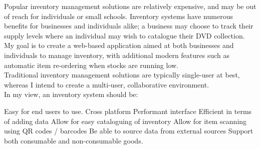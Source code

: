 \documentclass[../../../main.tex]{subfiles}
\begin{document}
\begin{comment}
- not always designed for multi user?
- not intuitive?

GS (till end): not user friendly?
shoudn't be time consuming to add data/etc
manual admin can be time consuming, try to automate
ability for mutliple concurrent users
easy and transpaancy for multi users
log in and see what was done the day before
easy to follow/read

not able to re-order items in a single place
have to go do diff platforms when ready to re-order

limited functionality
want to be able to track purchased items
as well as handle budgeting
existing solutions don't have multiple functions
so you need to duplicate information on different apps/areas
like how Monzo combines budgeting with card and tracking txns.

are these a problem with the current app or a problem you have that
you need a solution to.

is problem with current app
or need support with inventory/organisation

do more research on downsides of different alternatives/
\end{comment}

Popular inventory management solutions are relatively expensive, and may be out
of reach for individuals or small schools.
Inventory systems have numerous benefits for businesses and individuals alike; a business
may choose to track their supply levels where an individual may wish to catalogue their DVD collection. \\

\noindent My goal is to create a web-based application aimed at both businesses and individuals to manage
inventory, with additional modern features such as automatic item re-ordering when stocks are running low.\\

\noindent Traditional inventory management solutions are typically single-user at best, whereas I intend to create
a multi-user, collaborative environment.\\

\noindent In my view, an inventory system should be:

\begin{outline}
    \1 Easy for end users to use.
    \1 Cross platform
    \1 Performant interface
    \1 Efficient in terms of adding data
    \1 Allow for easy cataloguing of inventory
    \1 Allow for item scanning using QR codes / barcodes
    \1 Be able to source data from external sources
    \1 Support both consumable and non-consumable goods.


\end{outline}
\end{document}
